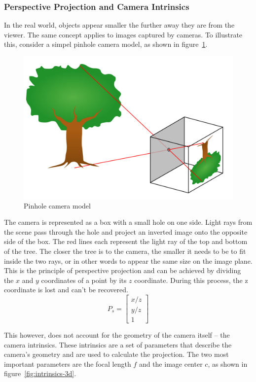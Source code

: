 \subsubsection{Perspective Projection and Camera Intrinsics}\label{sec:perspective-projection}
In the real world, objects appear smaller the further away they are from the viewer.
The same concept applies to images captured by cameras.
To illustrate this, consider a simpel pinhole camera model, as shown in figure~\ref{fig:pinhole-camera-model}.
\begin{figure}[h!]
    \centering
    \includegraphics[width=0.45\linewidth]{images/pinhole}
    \caption{Pinhole camera model}
    \label{fig:pinhole-camera-model}
\end{figure}
The camera is represented as a box with a small hole on one side.
Light rays from the scene pass through the hole and project an inverted image onto the opposite side of the box.
The red lines each represent the light ray of the top and bottom of the tree.
The closer the tree is to the camera, the smaller it needs to be to fit inside the two rays,
or in other words to appear the same size on the image plane.
This is the principle of perspective projection and can be achieved by dividing the
$x$ and $y$ coordinates of a point by its $z$ coordinate.
During this process, the z coordinate is lost and can't be recovered. \cite{szeliski_computer_nodate}
\begin{equation}
    P_s = \begin{bmatrix}
              x/z \\
              y/z \\
              1
    \end{bmatrix}
\end{equation}

This however, does not account for the geometry of the camera itself -- the camera intrinsics.
These intrinsics are a set of parameters that describe the camera's geometry and are used to calculate the projection.
The two most important parameters are the focal length $f$ and the image center $c$, as shown in figure~\ref{fig:intrinsics-3d}.


